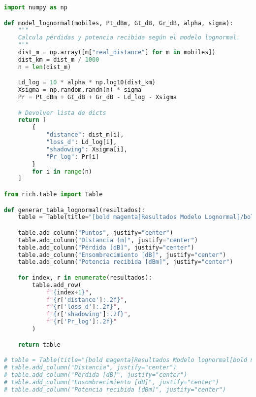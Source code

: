 \clearpage
\begin{lstlisting}[language=Python, caption={log\_normal.py}]
import numpy as np

def model_lognormal(mobiles, Pt_dBm, Gt_dB, Gr_dB, alpha, sigma):
    """
    Calcula pérdidas y potencia recibida según el modelo lognormal.
    """
    dist_m = np.array([m["real_distance"] for m in mobiles])
    dist_km = dist_m / 1000
    n = len(dist_m)

    Ld_log = 10 * alpha * np.log10(dist_km)
    Xsigma = np.random.randn(n) * sigma
    Pr = Pt_dBm + Gt_dB + Gr_dB - Ld_log - Xsigma

    # Devolver lista de dicts
    return [
        {
            "distance": dist_m[i],
            "loss_d": Ld_log[i],
            "shadowing": Xsigma[i],
            "Pr_log": Pr[i]
        }
        for i in range(n)
    ]

from rich.table import Table

def generar_tabla_lognormal(resultados):
    table = Table(title="[bold magenta]Resultados Modelo Lognormal[/bold magenta]")

    table.add_column("Puntos", justify="center")
    table.add_column("Distancia (m)", justify="center")
    table.add_column("Pérdida [dB]", justify="center")
    table.add_column("Ensombrecimiento [dB]", justify="center")
    table.add_column("Potencia recibida [dBm]", justify="center")

    for index, r in enumerate(resultados):
        table.add_row(
            f"{index+1}",
            f"{r['distance']:.2f}",
            f"{r['loss_d']:.2f}",
            f"{r['shadowing']:.2f}",
            f"{r['Pr_log']:.2f}"
        )

    return table

# table = Table(title="[bold magenta]Resultados Modelo lognormal[bold magenta]")
# table.add_column("Distancia", justify="center")
# table.add_column("Pérdida [dB]", justify="center")
# table.add_column("Ensombrecimiento [dB]", justify="center")
# table.add_column("Potencia recibida [dBm]", justify="center")
\end{lstlisting}
\clearpage
